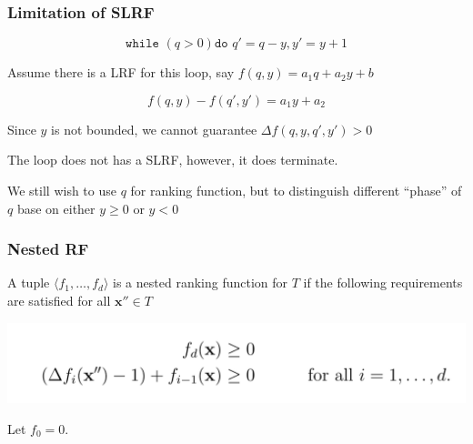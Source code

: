 \documentclass[11pt]{beamer}
\begin{document}
\begin{frame}\frametitle{Limitation of SLRF}
\[\texttt{while } (q > 0) \texttt{do } q' = q - y, y ' = y + 1\]

Assume there is a LRF for this loop, say $f(q, y) = a_1 q + a_2 y + b$

\[f(q, y) - f(q', y') = a_1y + a_2\]


Since $y$ is not bounded, we cannot guarantee  $\Delta f(q,y,q',y') > 0$

The loop does not has a SLRF, however, it does terminate.

We still wish to use $q$ for ranking function, but to distinguish different ``phase'' of $q$ base on either $y \ge 0$ or $y < 0$ 


\end{frame}
\begin{frame}\frametitle{Nested RF}

\begin{definition}

A tuple $\langle f_1, \ldots, f_d\rangle$ is a nested ranking function for $T$ if the following requirements are satisfied for all $\textbf{x}''\in T$
\begin{center}
\includegraphics[scale = 0.3]{6.PNG}

\end{center}

Let $f_0 = 0$.
\end{definition}


\end{frame}
\end{document}
